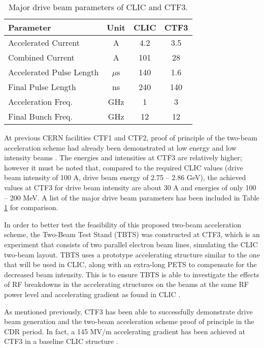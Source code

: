 \begin{table}[!htb]
\begin{center}
\begin{tabular}{l | c | c | c}
\textbf{Parameter}                & \textbf{Unit}    & \textbf{CLIC} & \textbf{CTF3} \\ \hline
    Accelerated Current      & A       & 4.2  & 3.5  \\
    Combined Current         & A       & 101  & 28   \\
    Accelerated Pulse Length & $\mu$s & 140  & 1.6  \\
    Final Pulse Length       & ns      & 240  & 140  \\
    Acceleration Freq.       & GHz     & 1    & 3    \\
    Final Bunch Freq.        & GHz     & 12   & 12   \\
\end{tabular}
\caption{Major drive beam parameters of CLIC and CTF3. \cite{CLIC:Concept}}
\label{tab:CLIC:Feasi2}
\end{center}
\end{table}

At previous CERN facilities CTF1 and CTF2, proof of principle of the two-beam acceleration scheme had already been demonstrated at low energy and low intensity beams \cite{Nuclear:CTF3}. The energies and intensities at CTF3 are relatively higher; however it must be noted that, compared to the required CLIC values (drive beam intensity of 100 A, drive beam energy of 2.75 – 2.86 GeV), the achieved values at CTF3 for drive beam intensity are about 30 A and energies of only 100 – 200 MeV. A list of the major drive beam parameters has been included in Table \ref{tab:CLIC:Feasi2} for comparison.

In order to better test the feasibility of this proposed two-beam acceleration scheme, the Two-Beam Test Stand (TBTS) \cite{Nuclear:CTF3} was constructed at CTF3, which is an experiment that consists of two parallel electron beam lines, simulating the CLIC two-beam layout. TBTS uses a prototype accelerating structure similar to the one that will be used in CLIC, along with an extra-long PETS to compensate for the decreased beam intensity. This is to ensure TBTS is able to investigate the effects of RF breakdowns in the accelerating structures on the beams at the same RF power level and accelerating gradient as found in CLIC \cite{Nuclear:CTF3}.

As mentioned previously, CTF3 has been able to successfully demonstrate drive beam generation and the two-beam acceleration scheme proof of principle in the CDR period. In fact, a 145 MV/m accelerating gradient has been achieved at CTF3 in a baseline CLIC structure \cite{CLIC:Concept}.

